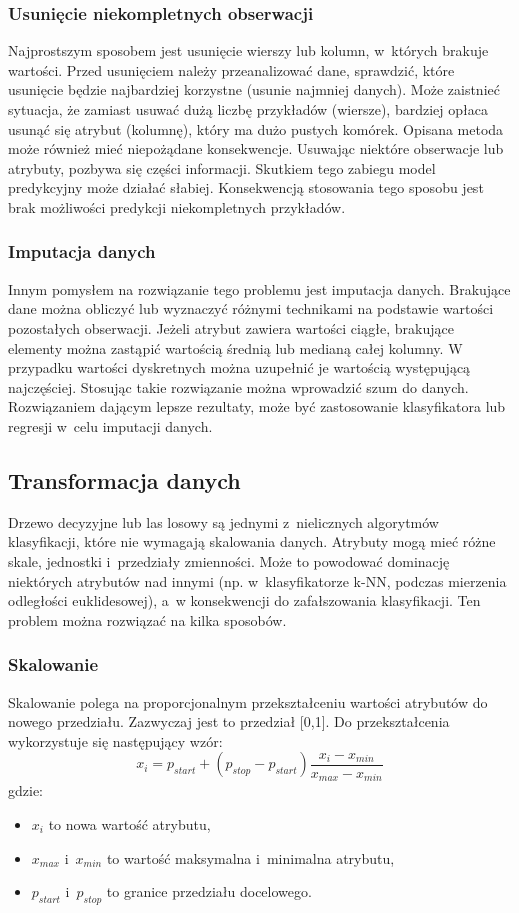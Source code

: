 \subsubsection{Usunięcie niekompletnych obserwacji}
Najprostszym sposobem jest usunięcie wierszy lub kolumn, w~których brakuje wartości. Przed usunięciem należy przeanalizować dane, sprawdzić, które usunięcie będzie najbardziej korzystne (usunie najmniej danych). Może zaistnieć sytuacja, że zamiast usuwać dużą liczbę przykładów (wiersze), bardziej opłaca usunąć się atrybut (kolumnę), który ma dużo pustych komórek. Opisana metoda może również mieć niepożądane konsekwencje. Usuwając niektóre obserwacje lub atrybuty, pozbywa się części informacji. Skutkiem tego zabiegu model predykcyjny może działać słabiej. Konsekwencją stosowania tego sposobu jest brak możliwości predykcji niekompletnych przykładów.
\subsubsection{Imputacja danych}
Innym pomysłem na rozwiązanie tego problemu jest imputacja danych. Brakujące dane można obliczyć lub wyznaczyć różnymi technikami na podstawie wartości pozostałych obserwacji. Jeżeli atrybut zawiera wartości ciągłe, brakujące elementy można zastąpić wartością średnią lub medianą całej kolumny. W przypadku wartości dyskretnych można uzupełnić je wartością występującą najczęściej. Stosując takie rozwiązanie można wprowadzić szum do danych. Rozwiązaniem dającym lepsze rezultaty, może być zastosowanie klasyfikatora lub regresji w~celu imputacji danych.
\subsection{Transformacja danych}
Drzewo decyzyjne lub las losowy są jednymi z~nielicznych algorytmów klasyfikacji, które nie wymagają skalowania danych. Atrybuty mogą mieć różne skale, jednostki i~przedziały zmienności. Może to powodować dominację niektórych atrybutów nad innymi (np. w~klasyfikatorze k-NN, podczas mierzenia odległości euklidesowej), a~w konsekwencji do zafałszowania klasyfikacji. Ten problem można rozwiązać na kilka sposobów.
\subsubsection{Skalowanie}
Skalowanie polega na proporcjonalnym przekształceniu wartości atrybutów do nowego przedziału. Zazwyczaj jest to przedział [0,1]. Do przekształcenia wykorzystuje się następujący wzór:
\[x_i=p_{start}+(p_{stop}-p_{start})\frac{x_i-x_{min}}{x_{max}-x_{min}}\]
gdzie:
\begin{itemize}
	\item $x_i$ to nowa wartość atrybutu,
	\item $x_{max}$ i~$x_{min}$ to wartość maksymalna i~minimalna atrybutu,
	\item $p_{start}$ i~$p_{stop}$ to granice przedziału docelowego.
\end{itemize}
